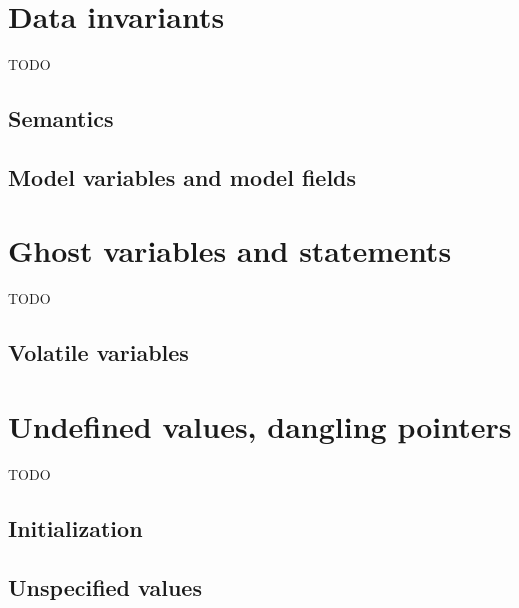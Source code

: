 \section{Data invariants}
\label{sec:invariants}

TODO


\subsection{Semantics}


\subsection{Model variables and model fields}


\section{Ghost variables and statements}
\label{sec:ghost}

TODO


\subsection{Volatile variables}\label{sec:volatile-variables}

\absent


\section{Undefined values, dangling pointers}

TODO


\subsection{Initialization}


\subsection{Unspecified values}

